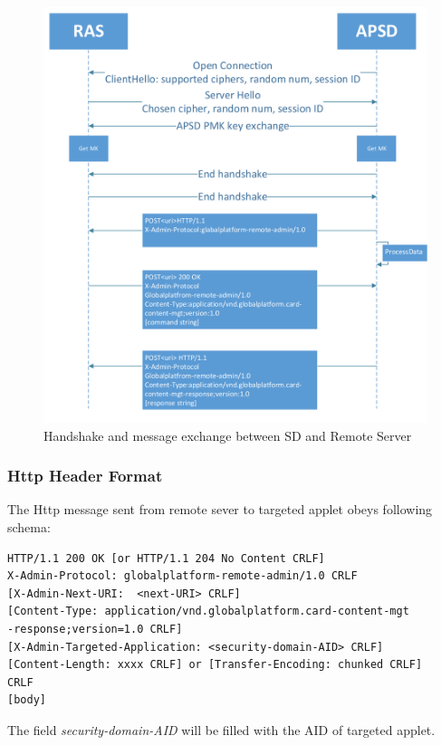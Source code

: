 \begin{figure}[!htbp]
	\centering
	\includegraphics[width=1\textwidth]{communication-flow}
		\caption{Handshake and message exchange between SD and Remote Server}
	\label{fig:communication-flow}
\end{figure}

\subsubsection{Http Header Format} \label{secHTTPHeader}
The Http message sent from remote sever to targeted applet obeys following schema\cite{gp}:
\begin{Verbatim}[fontsize=\relsize{-1}, frame=lines,framesep=4mm, label=\fbox{\small\emph{Http Request Schema}}]
HTTP/1.1 200 OK [or HTTP/1.1 204 No Content CRLF]
X-Admin-Protocol: globalplatform-remote-admin/1.0 CRLF
[X-Admin-Next-URI:  <next-URI> CRLF]
[Content-Type: application/vnd.globalplatform.card-content-mgt
-response;version=1.0 CRLF]
[X-Admin-Targeted-Application: <security-domain-AID> CRLF]
[Content-Length: xxxx CRLF] or [Transfer-Encoding: chunked CRLF]
CRLF
[body]
\end{Verbatim}
The field \emph{security-domain-AID} will be filled with the AID of targeted applet.


